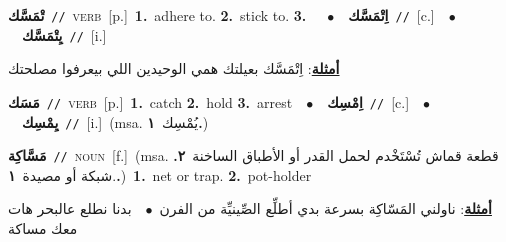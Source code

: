 \documentclass[10pt,a4paper,twoside]{article} %
\begin{document}
\begin{multicols}{2}
{\setlength\topsep{0pt}\textbf{\foreignlanguage{arabic}{تْمَسَّك}}\ {\color{gray}\texttt{//}\color{black}}\ \textsc{verb}\ [p.]\ \textbf{1.}~adhere to.  \textbf{2.}~stick to.  \textbf{3.}~\ \ $\bullet$\ \ \setlength\topsep{0pt}\textbf{\foreignlanguage{arabic}{اِتْمَسَّك}}\ {\color{gray}\texttt{//}\color{black}}\ [c.]\ \ $\bullet$\ \ \setlength\topsep{0pt}\textbf{\foreignlanguage{arabic}{يِتْمَسَّك}}\ {\color{gray}\texttt{//}\color{black}}\ [i.]\  \begin{flushright}\color{gray}\foreignlanguage{arabic}{\textbf{\underline{\foreignlanguage{arabic}{أمثلة}}}: اِتْمَسَّك بعيلتك همي الوحيدين اللي بيعرفوا مصلحتك}\end{flushright}\color{black}} \vspace{2mm}

{\setlength\topsep{0pt}\textbf{\foreignlanguage{arabic}{مَسَك}}\ {\color{gray}\texttt{//}\color{black}}\ \textsc{verb}\ [p.]\ \textbf{1.}~catch  \textbf{2.}~hold  \textbf{3.}~arrest\ \ $\bullet$\ \ \setlength\topsep{0pt}\textbf{\foreignlanguage{arabic}{اِمْسِك}}\ {\color{gray}\texttt{//}\color{black}}\ [c.]\ \ $\bullet$\ \ \setlength\topsep{0pt}\textbf{\foreignlanguage{arabic}{يِمْسِك}}\ {\color{gray}\texttt{//}\color{black}}\ [i.]\ \color{gray}(msa. \foreignlanguage{arabic}{يُمْسِك}~\foreignlanguage{arabic}{\textbf{١.}})\color{black}\ } \vspace{2mm}

{\setlength\topsep{0pt}\textbf{\foreignlanguage{arabic}{مَسَّاكِة}}\ {\color{gray}\texttt{//}\color{black}}\ \textsc{noun}\ [f.]\ \color{gray}(msa. \foreignlanguage{arabic}{قطعة قماش تُسْتَخْدم لحمل القدر أو الأطباق الساخنة}~\foreignlanguage{arabic}{\textbf{٢.}}  .\foreignlanguage{arabic}{شبكة أو مصيدة}~\foreignlanguage{arabic}{\textbf{١.}})\color{black}\ \textbf{1.}~net or trap.  \textbf{2.}~pot-holder\  \begin{flushright}\color{gray}\foreignlanguage{arabic}{\textbf{\underline{\foreignlanguage{arabic}{أمثلة}}}: ناولني المَسّاكِة بسرعة بدي أطلِّع الصِّينيِّة من الفرن\ $\bullet$\ \  بدنا نطلع عالبحر هات معك مساكة}\end{flushright}\color{black}} \vspace{2mm}


\end{multicols}
\end{document}
